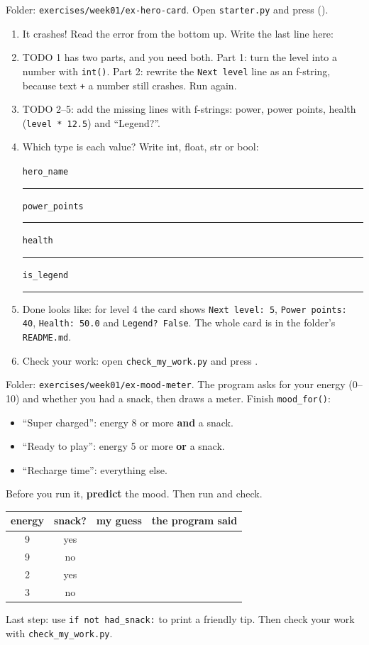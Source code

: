 \begin{exercise}
Folder: \texttt{exercises/week01/ex-hero-card}. Open \texttt{starter.py} and press  ().
\begin{enumerate}[leftmargin=1.4em]
  \item It crashes! Read the error from the bottom up. Write the last line here:
  \item TODO 1 has two parts, and you need both. Part 1: turn the level into a number with \texttt{int()}.
        Part 2: rewrite the \texttt{Next level} line as an f-string, because text \texttt{+} a number still crashes. Run again.
  \item TODO 2--5: add the missing lines with f-strings: power, power points, health (\texttt{level * 12.5}) and \enquote{Legend?}.
  \item Which type is each value? Write int, float, str or bool:\par
  \texttt{hero\_name} \rule{2cm}{0.4pt}\quad \texttt{power\_points} \rule{2cm}{0.4pt}\quad \texttt{health} \rule{2cm}{0.4pt}\quad \texttt{is\_legend} \rule{2cm}{0.4pt}
  \item Done looks like: for level 4 the card shows \texttt{Next level: 5}, \texttt{Power points: 40}, \texttt{Health: 50.0} and \texttt{Legend? False}.
        The whole card is in the folder's \texttt{README.md}.
  \item Check your work: open \texttt{check\_my\_work.py} and press .
\end{enumerate}
\end{exercise}

\begin{exercise}
Folder: \texttt{exercises/week01/ex-mood-meter}. The program asks for your energy (0--10) and whether you had a snack,
then draws a meter. Finish \texttt{mood\_for()}:
\begin{itemize}[leftmargin=1.2em]
  \item \enquote{Super charged}: energy 8 or more \textbf{and} a snack.
  \item \enquote{Ready to play}: energy 5 or more \textbf{or} a snack.
  \item \enquote{Recharge time}: everything else.
\end{itemize}
Before you run it, \textbf{predict} the mood. Then run and check.
\begin{center}
\renewcommand{\arraystretch}{1.5}
\begin{tabular}{|c|c|p{3.5cm}|p{3.5cm}|}
\hline
\textbf{energy} & \textbf{snack?} & \textbf{my guess} & \textbf{the program said} \\ \hline
9 & yes & & \\ \hline
9 & no & & \\ \hline
2 & yes & & \\ \hline
3 & no & & \\ \hline
\end{tabular}
\end{center}
Last step: use \texttt{if not had\_snack:} to print a friendly tip. Then check your work with \texttt{check\_my\_work.py}.
\end{exercise}

